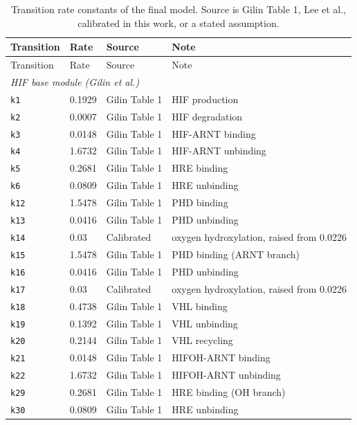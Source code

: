 \begin{longtable}{@{}llp{2.6cm}p{4.6cm}@{}}
\caption{Transition rate constants of the final model. Source is Gilin Table 1, Lee et al., calibrated in this work, or a stated assumption.}\label{tab:rates}\\
\toprule
Transition & Rate & Source & Note \\
\midrule
\endfirsthead
\toprule Transition & Rate & Source & Note \\ \midrule \endhead
\multicolumn{4}{l}{\textit{HIF base module (Gilin et al.)}} \\
\texttt{k1} & 0.1929 & Gilin Table 1 & HIF production \\
\texttt{k2} & 0.0007 & Gilin Table 1 & HIF degradation \\
\texttt{k3} & 0.0148 & Gilin Table 1 & HIF-ARNT binding \\
\texttt{k4} & 1.6732 & Gilin Table 1 & HIF-ARNT unbinding \\
\texttt{k5} & 0.2681 & Gilin Table 1 & HRE binding \\
\texttt{k6} & 0.0809 & Gilin Table 1 & HRE unbinding \\
\texttt{k12} & 1.5478 & Gilin Table 1 & PHD binding \\
\texttt{k13} & 0.0416 & Gilin Table 1 & PHD unbinding \\
\texttt{k14} & 0.03 & Calibrated & oxygen hydroxylation, raised from 0.0226 \\
\texttt{k15} & 1.5478 & Gilin Table 1 & PHD binding (ARNT branch) \\
\texttt{k16} & 0.0416 & Gilin Table 1 & PHD unbinding \\
\texttt{k17} & 0.03 & Calibrated & oxygen hydroxylation, raised from 0.0226 \\
\texttt{k18} & 0.4738 & Gilin Table 1 & VHL binding \\
\texttt{k19} & 0.1392 & Gilin Table 1 & VHL unbinding \\
\texttt{k20} & 0.2144 & Gilin Table 1 & VHL recycling \\
\texttt{k21} & 0.0148 & Gilin Table 1 & HIFOH-ARNT binding \\
\texttt{k22} & 1.6732 & Gilin Table 1 & HIFOH-ARNT unbinding \\
\texttt{k29} & 0.2681 & Gilin Table 1 & HRE binding (OH branch) \\
\texttt{k30} & 0.0809 & Gilin Table 1 & HRE unbinding \\

\end{longtable}
